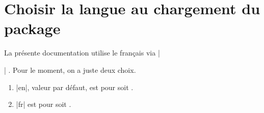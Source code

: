 

\usepackage{../macroenv/macroenv}
\usepackage{../listing/listing}
\usepackage{../inenglish/inenglish}


\usepackage[lang = fr]{main}




\section{Choisir la langue au chargement du package}

La présente documentation utilise le français via \bdocinlatex|\usepackage[lang = fr]{bdoc}| .
Pour le moment, on a juste deux choix.

\begin{enumerate}
    \item \bdocinlatex|en|, valeur par défaut, est pour  soit .

    \item \bdocinlatex|fr| est pour  soit .
\end{enumerate}


